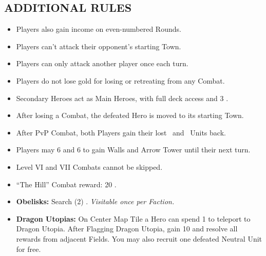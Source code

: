 \begin{multicols}{2}
\subsection*{\MakeUppercase{Additional Rules}}
\begin{itemize}
  \item Players also gain income on even-numbered Rounds.
  \item Players can't attack their opponent's starting Town.
  \item Players can only attack another player once each turn.
  \item Players do not lose gold for losing or retreating from any Combat.
  \item Secondary Heroes act as Main Heroes, with full deck access and 3 .
  \item After losing a Combat, the defeated Hero is moved to its starting Town.
  \item After PvP Combat, both Players gain their lost \bronze\ and \silver\ Units back.
  \item Players may  6  and 6  to gain Walls and Arrow Tower until their next turn.
  \item Level VI and VII Combats cannot be skipped.
  \item ``The Hill'' Combat reward: 20 .
  \item \textbf{Obelisks:} Search (2) . \textit{Visitable once per Faction.}
  \item \textbf{Dragon Utopias:} On Center Map Tile a Hero can spend 1  to teleport to Dragon Utopia. After Flagging Dragon Utopia, gain 10  and resolve all rewards from adjacent Fields. You may also recruit one defeated Neutral Unit for free.
\end{itemize}

\columnbreak

\end{multicols}
